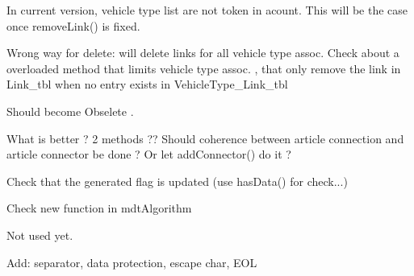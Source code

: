 \begin{DoxyRefList}
In current version, vehicle type list are not token in acount. This will be the case once remove\-Link() is fixed.  
\item[\label{todo__todo000043}%
\hypertarget{todo__todo000043}{}%
Member \hyperlink{classmdt_cl_link_a865c0cee1fab1c9209d139dcd70f9fbd}{mdt\-Cl\-Link\-:\-:remove\-Link} (const Q\-Variant \&unit\-Connection\-Start\-Id, const Q\-Variant \&unit\-Connection\-End\-Id, bool handle\-Transaction=true)]Wrong way for delete\-: will delete links for all vehicle type assoc. Check about a overloaded method that limits vehicle type assoc. , that only remove the link in Link\-\_\-tbl when no entry exists in Vehicle\-Type\-\_\-\-Link\-\_\-tbl  
\item[\label{todo__todo000046}%
\hypertarget{todo__todo000046}{}%
Member \hyperlink{classmdt_cl_path_graph_a63ddfb9e8d64041ad17c992eac172a8a}{mdt\-Cl\-Path\-Graph\-:\-:last\-Error\-Message} () const ]Should become Obselete .  
\item[\label{todo__todo000047}%
\hypertarget{todo__todo000047}{}%
Member \hyperlink{classmdt_cl_unit_a9aa3d52f4e6d79fa003d96e04be8223e}{mdt\-Cl\-Unit\-:\-:add\-Connection\-Data\-List\-From\-Article\-Connection\-Id\-List} (\hyperlink{classmdt_cl_unit_connector_data}{mdt\-Cl\-Unit\-Connector\-Data} \&data, const Q\-List$<$ Q\-Variant $>$ \&article\-Connection\-Id\-List, bool copy\-Contact\-Name)]What is better ? 2 methods ?? Should coherence between article connection and article connector be done ? Or let add\-Connector() do it ? 
\item[\label{todo__todo000048}%
\hypertarget{todo__todo000048}{}%
Member \hyperlink{classmdt_cl_unit_connection_data_a6922e05be582dd95de82bfe4dd8434f9}{mdt\-Cl\-Unit\-Connection\-Data\-:\-:mdt\-Cl\-Unit\-Connection\-Data} (const Q\-Sql\-Record \&record)]Check that the generated flag is updated (use has\-Data() for check...)  
\item[\label{todo__todo000075}%
\hypertarget{todo__todo000075}{}%
Member \hyperlink{classmdt_csv_file_afe815d4fbdc08c442c9b1dce447cda75}{mdt\-Csv\-File\-:\-:clear} ()]Check new function in mdt\-Algorithm  
\item[\label{todo__todo000081}%
\hypertarget{todo__todo000081}{}%
Member \hyperlink{classmdt_data_table_manager_a8fa0924a76e8f3fec9617f690cc4e148}{mdt\-Data\-Table\-Manager\-:\-:data\-Set\-Directory} () const ]Not used yet.  
\item[\label{todo__todo000082}%
\hypertarget{todo__todo000082}{}%
Member \hyperlink{classmdt_data_table_manager_abe733f071ca77579522823598e79dd9a}{mdt\-Data\-Table\-Manager\-:\-:export\-To\-Csv\-File} (const Q\-String \&file\-Path, \hyperlink{classmdt_sql_database_manager_a2f5b46d67a88095053a5edfc415c7418}{mdt\-Sql\-Database\-Manager\-::create\-Mode\-\_\-t} mode)]Add\-: separator, data protection, escape char, E\-O\-L 


\end{DoxyRefList}
